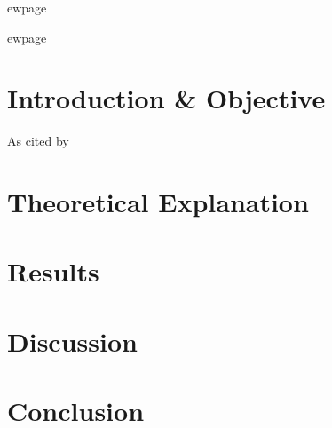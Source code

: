 \documentclass{article}
\begin{document}


ewpage
\tableofcontents

ewpage

\section{Introduction \& Objective}
As cited by \cite{10.5555/519085}
\section{Theoretical Explanation}
\section{Results}
\section{Discussion}
\section{Conclusion}

\renewcommand{\bibname}{References}

\end{document}
